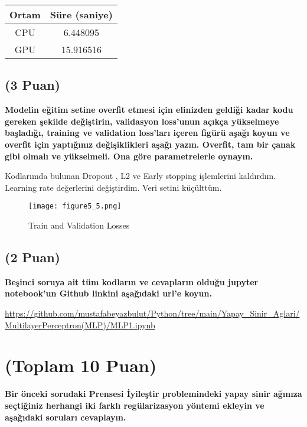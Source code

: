 \documentclass[11pt]{article}
\begin{document}
\vspace{.6in}

\begin{table}[ht!]
    \centering
    \begin{tabular}{c|c}
        Ortam & Süre (saniye) \\\hline
        CPU & 6.448095 \\
        GPU & 15.916516\\
    \end{tabular}
    \label{tab:my_table}
\end{table}

\newpage

\subsection{(3 Puan)} \textbf{Modelin eğitim setine overfit etmesi için elinizden geldiği kadar kodu gereken şekilde değiştirin, validasyon loss'unun açıkça yükselmeye başladığı, training ve validation loss'ları içeren figürü aşağı koyun ve overfit için yaptığınız değişiklikleri aşağı yazın. Overfit, tam bir çanak gibi olmalı ve yükselmeli. Ona göre parametrelerle oynayın.}

Kodlarımda bulunan Dropout , L2 ve Early stopping işlemlerini kaldırdım. Learning rate değerlerini değiştirdim. Veri setini küçülttüm. 
\begin{figure}[ht!]
    \centering
    \texttt{[image: figure5\_5.png]}
    \caption{Train and Validation Losses}
    \label{fig:my_pic2}
\end{figure}


\subsection{(2 Puan)} \textbf{Beşinci soruya ait tüm kodların ve cevapların olduğu jupyter notebook'un Github linkini aşağıdaki url'e koyun.}

\url{https://github.com/mustafabeyazbulut/Python/tree/main/Yapay_Sinir_Aglari/MultilayerPerceptron(MLP)/MLP1.ipynb}

\newpage

\section{(Toplam 10 Puan)} \textbf{Bir önceki sorudaki Prensesi İyileştir problemindeki yapay sinir ağınıza seçtiğiniz herhangi iki farklı regülarizasyon yöntemi ekleyin ve aşağıdaki soruları cevaplayın.} 
\end{document}
